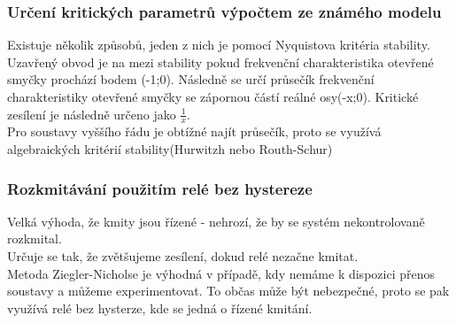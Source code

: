 \subsubsection*{Určení kritických parametrů výpočtem ze známého modelu}
Existuje několik způsobů, jeden z nich je pomocí Nyquistova kritéria stability. Uzavřený obvod je na mezi stability pokud frekvenční charakteristika otevřené smyčky prochází bodem (-1;0). Následně se určí průsečík frekvenční charakteristiky otevřené smyčky se zápornou částí reálné osy(-x;0). Kritické zesílení je následně určeno jako $\frac{1}{x}$.\\
Pro soustavy vyššího řádu je obtížné najít průsečík, proto se využívá algebraických kritérií stability(Hurwitzh nebo Routh-Schur)

\subsubsection*{Rozkmitávání použitím relé bez hystereze}
Velká výhoda, že kmity jsou řízené - nehrozí, že by se systém nekontrolovaně rozkmital.\\
Určuje se tak, že zvětšujeme zesílení, dokud relé  nezačne kmitat.\\

Metoda Ziegler-Nicholse je výhodná v případě, kdy nemáme k dispozici přenos soustavy a můžeme experimentovat. To občas může být nebezpečné, proto se pak využívá relé bez hysterze, kde se jedná o řízené kmitání.\\

